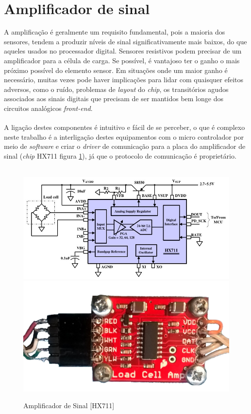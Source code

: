 \section{Amplificador de sinal}
A amplificação é geralmente um requisito fundamental, pois a maioria dos sensores, tendem a produzir níveis de sinal significativamente mais baixos, do que aqueles usados no processador digital. Sensores resistivos podem precisar de um amplificador para a célula de carga. Se possível, é vantajoso ter o ganho o mais próximo possível do elemento sensor. Em situações onde um maior ganho é necessário, muitas vezes pode haver implicações para lidar com quaisquer efeitos adversos, como o ruído, problemas de \textit{layout} do \textit{chip}, os transitórios agudos associados aos sinais digitais que precisam de ser mantidos bem longe dos circuitos analógicos \textit{front-end}. \cite{book-9}
\\
\\
A ligação destes componentes é intuitivo e fácil de se perceber, o que é complexo neste trabalho é a interligação destes equipamentos com o micro controlador por meio de \textit{software} e criar o \textit{driver} de comunicação para a placa do amplificador de sinal (\textit{chip} HX711 figura \ref{HX711_Schematic_1}), já que o protocolo de comunicação é proprietário.
\\
\\
\begin{figure}[H]
	\captionsetup{justification=raggedright,singlelinecheck=false}
	\centering
	\includegraphics[scale=0.35]{./image/PESTA/schematic/HX711_Schematic_1.jpg}
	\includegraphics[scale=0.1]{./image/PESTA/material/HX711_board_1.jpg}
	\caption{Amplificador de Sinal [HX711]}
	\label{HX711_Schematic_1}
\end{figure}
